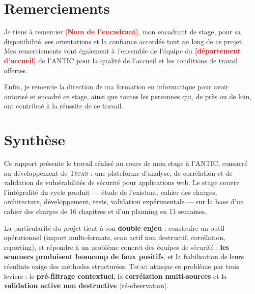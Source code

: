 \documentclass[11pt,a4paper]{report}
\newcommand{\tscan}{\textsc{Tscan}}
\newcommand{\todo}[1]{\textcolor{red}{\textbf{[#1]}}}
\begin{document}
\chapter*{Remerciements}

Je tiens à remercier \todo{Nom de l'encadrant}, mon encadrant de stage, pour sa
disponibilité, ses orientations et la confiance accordée tout au long de ce projet. Mes
remerciements vont également à l'ensemble de l'équipe du \todo{département d'accueil} de
l'ANTIC pour la qualité de l'accueil et les conditions de travail offertes.

Enfin, je remercie la direction de ma formation en informatique pour avoir autorisé et
encadré ce stage, ainsi que toutes les personnes qui, de près ou de loin, ont contribué à
la réussite de ce travail.

\tableofcontents

\chapter*{Synthèse}

Ce rapport présente le travail réalisé au cours de mon stage à l'ANTIC, consacré au
développement de \tscan{} : une plateforme d'analyse, de corrélation et de validation de
vulnérabilités de sécurité pour applications web. Le stage couvre l'intégralité du cycle
produit --- étude de l'existant, cahier des charges, architecture, développement, tests,
validation expérimentale --- sur la base d'un cahier des charges de 16 chapitres et d'un
planning en 11 semaines.

La particularité du projet tient à son \textbf{double enjeu} : construire un outil
opérationnel (import multi-formats, scan actif non destructif, corrélation, reporting), et
répondre à un problème concret des équipes de sécurité : \textbf{les scanners produisent
beaucoup de faux positifs}, et la fiabilisation de leurs résultats exige des méthodes
structurées. \tscan{} attaque ce problème par trois leviers : le \textbf{pré-filtrage
contextuel}, la \textbf{corrélation multi-sources} et la \textbf{validation active non
destructive} (ré-observation).
\end{document}
